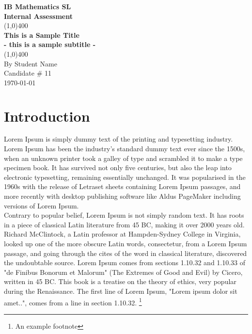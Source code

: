 \documentclass[11pt]{article}
\begin{document}
\begin{titlepage}
\begin{center}
\vspace*{1cm}
\Large{ \textbf{IB Mathematics SL}}\\
\Large{\textbf{Internal Assessment}}\\
\vfill
\line(1,0){400}\\[1mm]
\huge{\textbf{This is a Sample Title}}\\[3mm]
\Large{\textbf{- this is a sample subtitle -}}\\[1mm]
\line(1,0){400}\\
\vfill
By Student Name\\
Candidate \# 11 \\
\today
\end{center}
\end{titlepage}



\tableofcontents
\thispagestyle{empty}
\clearpage

\setcounter{page}{1}




\section{Introduction}
Lorem Ipsum is simply dummy text of the printing and typesetting industry. Lorem Ipsum has been the industry's standard dummy text ever since the 1500s, when an unknown printer took a galley of type and scrambled it to make a type specimen book. It has survived not only five centuries, but also the leap into electronic typesetting, remaining essentially unchanged. It was popularised in the 1960s with the release of Letraset sheets containing Lorem Ipsum passages, and more recently with desktop publishing software like Aldus PageMaker including versions of Lorem Ipsum.\\

Contrary to popular belief, Lorem Ipsum is not simply random text. It has roots in a piece of classical Latin literature from 45 BC, making it over 2000 years old. Richard McClintock, a Latin professor at Hampden-Sydney College in Virginia, looked up one of the more obscure Latin words, consectetur, from a Lorem Ipsum passage, and going through the cites of the word in classical literature, discovered the undoubtable source. Lorem Ipsum comes from sections 1.10.32 and 1.10.33 of "de Finibus Bonorum et Malorum" (The Extremes of Good and Evil) by Cicero, written in 45 BC. This book is a treatise on the theory of ethics, very popular during the Renaissance. The first line of Lorem Ipsum, "Lorem ipsum dolor sit amet..", comes from a line in section 1.10.32. \footnote{An example footnote} \\
\end{document}
